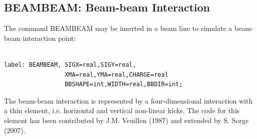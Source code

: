 





\subsection{BEAMBEAM: Beam-beam Interaction}
 
 The command BEAMBEAM may be inserted in a beam line
 to simulate a beam-beam interaction point:
 
\begin{verbatim}

label: BEAMBEAM, SIGX=real,SIGY=real,
                 XMA=real,YMA=real,CHARGE=real
                 BBSHAPE=int,WIDTH=real,BBDIR=int;
\end{verbatim}
 The beam-beam interaction is represented by a
 four-dimensional interaction with a thin element, i.e. horizontal
 and vertical non-linear kicks.
 The code for this element has been contributed by J.M. Veuillen 
 (1987) and extended by S. Sorge (2007).
 
